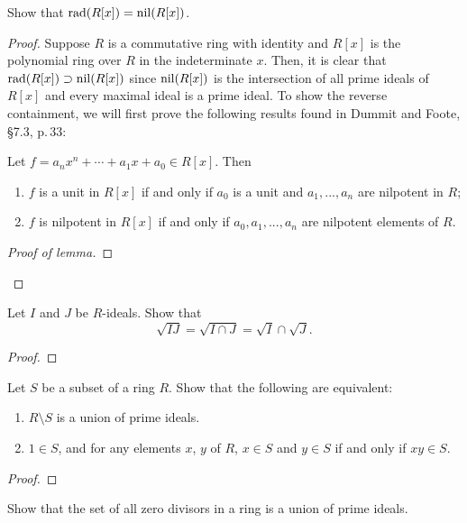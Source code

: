 \begin{problem}
Show that $\mathrm{rad}(R[x])=\mathrm{nil}(R[x])$.
\end{problem}
\begin{proof}
Suppose $R$ is a commutative ring with identity and $R[x]$ is the
polynomial ring over $R$ in the indeterminate $x$. Then, it is
clear that $\mathrm{rad}(R[x])\supset\mathrm{nil}(R[x])$ since $\mathrm{nil}(R[x])$ is
the intersection of all prime ideals of $R[x]$ and every maximal
ideal is a prime ideal. To show the reverse containment, we will
first prove the following results found in Dummit and Foote,
\S7.3, p.\,33:
\begin{lemma}
Let $f=a_nx^n+\cdots+a_1x+a_0\in R[x]$. Then
\begin{enumerate}[noitemsep,label=(\alph*)]
\item $f$ is a unit in $R[x]$ if and only if $a_0$ is a unit and
  $a_1,...,a_n$ are nilpotent in $R$;
\item $f$ is nilpotent in $R[x]$ if and only if $a_0,a_1,...,a_n$
  are nilpotent elements of $R$.
\end{enumerate}
\end{lemma}
\begin{proof}[Proof of lemma]
\renewcommand\qedsymbol{$\clubsuit$}
\end{proof}
\end{proof}
\newpage
\begin{problem}
Let $I$ and $J$ be $R$-ideals. Show that
\[\sqrt{IJ}=\sqrt{I\cap J}=\sqrt{I}\cap\sqrt{J}.\]
\end{problem}
\begin{proof}
\end{proof}
\newpage
\begin{problem}
Let $S$ be a subset of a ring $R$. Show that the following are
equivalent:
\begin{enumerate}[noitemsep,label=(\roman*)]
\item $R\setminus S$ is a union of prime ideals.
\item $1\in S$, and for any elements $x$, $y$ of $R$, $x\in S$
  and $y\in S$ if and only if $xy\in S$.
\end{enumerate}
\end{problem}
\begin{proof}

\end{proof}
\newpage
\begin{problem}
Show that the set of all zero divisors in a ring is a union of
prime ideals.
\end{problem}
